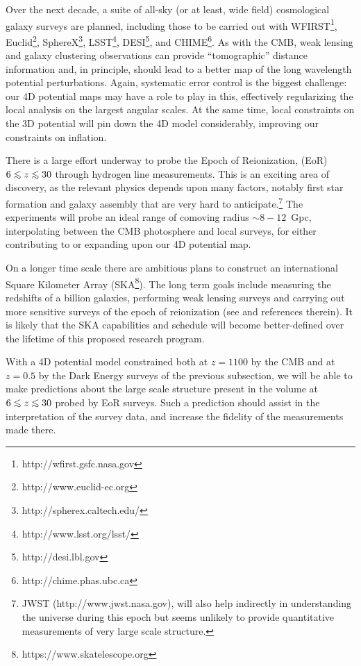 \documentclass[psfig,12pt]{article}
\def\ni{\noindent}
\def\lo{\mathrel{\raise.3ex\hbox{$<$}\mkern-14mu\lower0.6ex\hbox{$\sim$}}}
\begin{document}
{\ni{\bf Survey Telescopes:}
Over the next decade, a suite of all-sky (or at least, wide field)
cosmological galaxy surveys are planned, including those to be carried
out with
WFIRST\footnote{http://wfirst.gsfc.nasa.gov},
Euclid\footnote{http://www.euclid-ec.org},
SphereX\footnote{http://spherex.caltech.edu/},
LSST\footnote{http://www.lsst.org/lsst/},
DESI\footnote{http://desi.lbl.gov},
and
CHIME\footnote{http://chime.phas.ubc.ca}.
As with the CMB, weak lensing and galaxy clustering observations can provide ``tomographic'' distance information and, in principle, should lead to a better map of the long wavelength potential perturbations. Again, systematic error control is the biggest challenge: our 4D potential maps may have a role to play in this, effectively regularizing the local analysis on the largest angular scales. At the same time, local constraints on the 3D potential will pin down the 4D model considerably, improving our constraints on inflation.


\ni{\bf Epoch of Reionization:}
There is a large effort underway to probe the Epoch of Reionization, (EoR) $6\lo z\lo30$ through hydrogen line measurements. This is an exciting area of discovery, as the relevant physics depends upon many factors, notably first star formation and galaxy assembly that are very hard to anticipate.\footnote{JWST (http://www.jwst.nasa.gov), will also help indirectly in understanding the universe during this epoch but seems unlikely to provide quantitative measurements of very large scale structure.} The experiments will probe an ideal range of comoving radius $\sim8-12$~Gpc, interpolating between the CMB photosphere and local surveys,  for either contributing to or expanding upon our 4D potential map.

On a longer time scale there are ambitious plans to construct an international Square Kilometer Array (SKA\footnote{https://www.skatelescope.org}). The long term goals include measuring the redshifts of a billion galaxies, performing weak lensing surveys and carrying out more sensitive surveys of the epoch of reionization (see  \cite{SKACosmology} and references therein). It is likely that the SKA capabilities and schedule will become better-defined over the lifetime of this proposed research program.

With a 4D potential model constrained both at $z=1100$ by the CMB and at $z=0.5$ by the Dark Energy surveys of the previous subsection, we will be able to make predictions about the large scale structure present in the volume at $6\lo z\lo30$ probed by EoR surveys. Such a prediction should assist in the interpretation of the survey data, and increase the fidelity of the measurements made there.


}
\end{document}
